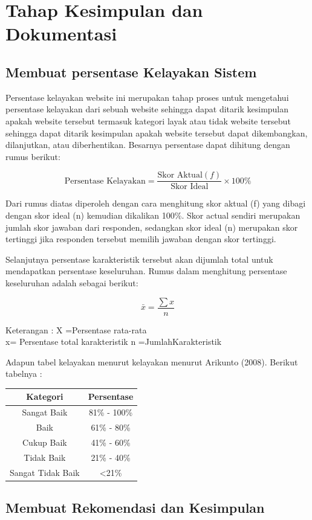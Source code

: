 \section{Tahap Kesimpulan dan Dokumentasi}
\subsection{Membuat persentase Kelayakan Sistem}
Persentase kelayakan website ini merupakan tahap proses untuk mengetahui persentase kelayakan dari sebuah website sehingga dapat ditarik kesimpulan apakah website tersebut termasuk kategori layak atau tidak website tersebut sehingga dapat ditarik kesimpulan apakah website tersebut dapat dikembangkan, dilanjutkan, atau diberhentikan. Besarnya persentase dapat dihitung dengan rumus berikut:

\[
\text{Persentase Kelayakan} = \frac{\text{Skor Aktual}(f)}{\text{Skor Ideal}} \times 100\%
\]

Dari rumus diatas diperoleh dengan cara menghitung skor
aktual (f) yang dibagi dengan skor ideal (n) kemudian dikalikan 100\%. Skor actual sendiri merupakan jumlah skor jawaban dari responden, sedangkan skor ideal (n) merupakan skor tertinggi jika responden tersebut memilih jawaban dengan skor tertinggi.

Selanjutnya persentase karakteristik tersebut akan dijumlah total untuk mendapatkan persentase keseluruhan. Rumus dalam menghitung persentase keseluruhan adalah sebagai berikut:

\[
\bar{x} = \frac{\sum x}{n}
\]

Keterangan :
X =Persentase rata-rata \\
x= Persentase total karakteristik
n =JumlahKarakteristik

Adapun tabel kelayakan menurut kelayakan menurut Arikunto (2008). Berikut tabelnya :

\begin{table}[h!]
	\centering
	\begin{tabular}{cc}
	\hline
	\textbf{Kategori}        & \textbf{Persentase} \\ \hline
	Sangat Baik              & 81\% - 100\%        \\
	Baik                     & 61\% - 80\%         \\
	Cukup Baik               & 41\% - 60\%         \\
	Tidak Baik               & 21\% - 40\%         \\
	Sangat Tidak Baik        & \textless 21\%      \\ \hline
	\end{tabular}
	\end{table}
	
	
\subsection{Membuat Rekomendasi dan Kesimpulan}
